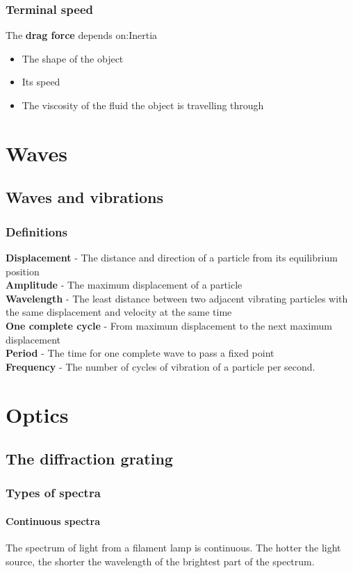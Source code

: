 \documentclass{article}[18pt]
\begin{document}
\subsubsection{Terminal speed}
The \textbf{drag force} depends on:Inertia
\begin{itemize}
\item The shape of the object
\item Its speed
\item The viscosity of the fluid the object is travelling through
\end{itemize}
\section{Waves}
\subsection{Waves and vibrations}
\subsubsection{Definitions}
\textbf{Displacement} - The distance and direction of a particle from its equilibrium position\\
\textbf{Amplitude} - The maximum displacement of a particle\\
\textbf{Wavelength} - The least distance between two adjacent vibrating particles with the same displacement and velocity at the same time\\
\textbf{One complete cycle} - From maximum displacement to the next maximum displacement\\
\textbf{Period} - The time for one complete wave to pass a fixed point\\
\textbf{Frequency} - The number of cycles of vibration of a particle per second.
\section{Optics}
\subsection{The diffraction grating}
\subsubsection{Types of spectra}
\paragraph{Continuous spectra}
The spectrum of light from a filament lamp is continuous. The hotter the light source, the shorter the wavelength of the brightest part of the spectrum.
\end{document}
